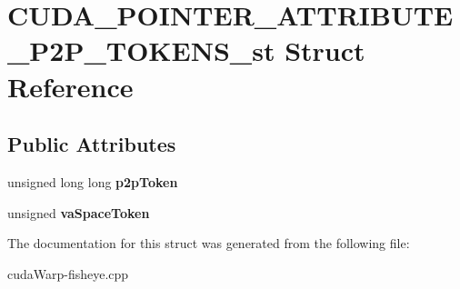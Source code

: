 \hypertarget{structCUDA__POINTER__ATTRIBUTE__P2P__TOKENS__st}{}\section{C\+U\+D\+A\+\_\+\+P\+O\+I\+N\+T\+E\+R\+\_\+\+A\+T\+T\+R\+I\+B\+U\+T\+E\+\_\+\+P2\+P\+\_\+\+T\+O\+K\+E\+N\+S\+\_\+st Struct Reference}
\label{structCUDA__POINTER__ATTRIBUTE__P2P__TOKENS__st}
\subsection*{Public Attributes}
\begin{DoxyCompactItemize}
\item 
unsigned long long {\bfseries p2p\+Token}\hypertarget{structCUDA__POINTER__ATTRIBUTE__P2P__TOKENS__st_af39418c43cb73b825a93471dbe6c8f97}{}\label{structCUDA__POINTER__ATTRIBUTE__P2P__TOKENS__st_af39418c43cb73b825a93471dbe6c8f97}

\item 
unsigned {\bfseries va\+Space\+Token}\hypertarget{structCUDA__POINTER__ATTRIBUTE__P2P__TOKENS__st_a161505f7e84e2230b1370783ea7e6e9b}{}\label{structCUDA__POINTER__ATTRIBUTE__P2P__TOKENS__st_a161505f7e84e2230b1370783ea7e6e9b}

\end{DoxyCompactItemize}


The documentation for this struct was generated from the following file\+:\begin{DoxyCompactItemize}
\item 
cuda\+Warp-\/fisheye.\+cpp\end{DoxyCompactItemize}
